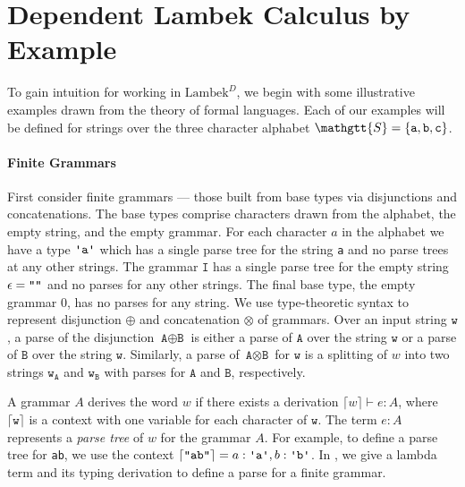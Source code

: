 \documentclass[acmsmall,nonacm]{acmart}
\renewcommand{\Sigma}{\mathgtt{S}}
\newcommand{\theoryname}{Dependent Lambek Calculus\xspace}
\newcommand{\theoryabbv}{$\textrm{Lambek}^D$\xspace}
\newcommand{\literal}[1]{\texttt{\textquotesingle#1\textquotesingle}}
\newcommand{\stringquote}[1]{\texttt{\textquotedbl#1\textquotedbl}}
\newcommand{\internalize}[1]{\lceil#1\rceil}
\begin{document}
\section{\theoryname by Example}
\label{sec:type-theory-examples}
To gain intuition for working in \theoryabbv, we begin with some
illustrative examples drawn from the theory of formal languages. Each
of our examples will be defined for strings over the three character
alphabet $\Sigma = \{ \texttt{a} , \texttt{b}, \texttt{c} \}$.

\newcommand{\A}{\texttt{A}}
\newcommand{\B}{\texttt{B}}
\newcommand{\I}{\texttt{I}}
\newcommand{\f}{\texttt{f}}
\newcommand{\g}{\texttt{g}}
\renewcommand{\L}{\texttt{L}}
\renewcommand{\a}{\texttt{a}}
\renewcommand{\b}{\texttt{b}}
\renewcommand{\c}{\texttt{c}}
\newcommand{\w}{\texttt{w}}

\paragraph{Finite Grammars}
First consider finite grammars --- those built from base types via disjunctions and
concatenations. The base types comprise characters drawn from the alphabet, the
empty string, and the empty grammar.
For each character $a$ in the alphabet we have a type $\literal a$ which
has a single parse tree for the string
\stringquote{a} and no parse trees at any other strings. The grammar $\I$ has a single
parse tree for the empty string $\epsilon = \stringquote{}$ and no parses for any other strings.
The final base type, the empty grammar $0$, has no parses for any string. We
use type-theoretic syntax to represent disjunction $\oplus$ and concatenation
$\otimes$ of
grammars. Over an input string $\w$, a parse of the disjunction $\A \oplus \B$ is either
a parse of $\A$ over the string $\w$ or a
parse of $\B$ over the string $\w$. Similarly, a parse of $\A \otimes \B$ for
$\w$ is a splitting of $w$ into two strings $\w_{\A}$ and $\w_{\B}$ with
parses for $\A$
and $\B$, respectively.

A grammar $A$ derives the word $w$ if there exists a derivation
$\internalize{w} \vdash e : A$,
where $\internalize \w$ is a context with one variable for each character of
$\w$. The term $e : A$ represents a \emph{parse tree} of $w$ for the grammar $A$. For
example, to define a parse tree for \stringquote{ab}, we use
the context $\internalize{\stringquote{ab}} = a : \literal a , b :
\literal b$. In , we give a lambda term and its
typing derivation to define a parse for a finite grammar.
\end{document}
